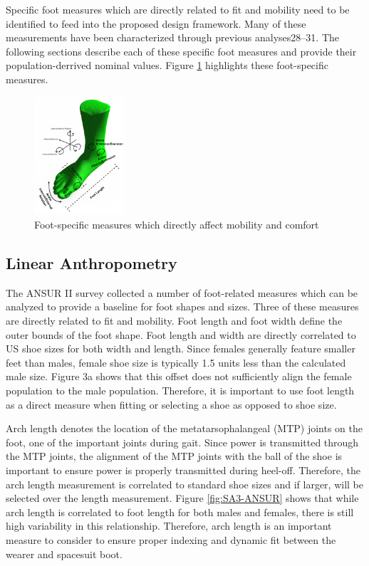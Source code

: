 \documentclass[defaultstyle,11pt]{comps}
\begin{document}
Specific foot measures which are directly related to fit and mobility need to be identified to feed into the proposed design framework.
Many of these measurements have been characterized through previous analyses28--31.
The following sections describe each of these specific foot measures and provide their population-derrived nominal values.
Figure \ref{fig:SA3-Foot} highlights these foot-specific measures.

\begin{figure}
\hypertarget{fig:SA3-Foot}{%
\centering
\includegraphics[width=0.3\textwidth,height=\textheight]{../fig/SA3/FootOverview.png}
\caption{Foot-specific measures which directly affect mobility and comfort}\label{fig:SA3-Foot}
}
\end{figure}

\hypertarget{linear-anthropometry}{%
\subsection{Linear Anthropometry}\label{linear-anthropometry}}

The ANSUR II survey collected a number of foot-related measures which can be analyzed to provide a baseline for foot shapes and sizes\citep{Gordon2014}.
Three of these measures are directly related to fit and mobility.
Foot length and foot width define the outer bounds of the foot shape.
Foot length and width are directly correlated to US shoe sizes for both width and length.
Since females generally feature smaller feet than males, female shoe size is typically 1.5 units less than the calculated male size.
Figure 3a shows that this offset does not sufficiently align the female population to the male population.
Therefore, it is important to use foot length as a direct measure when fitting or selecting a shoe as opposed to shoe size.

Arch length denotes the location of the metatarsophalangeal (MTP) joints on the foot, one of the important joints during gait.
Since power is transmitted through the MTP joints, the alignment of the MTP joints with the ball of the shoe is important to ensure power is properly transmitted during heel-off.
Therefore, the arch length measurement is correlated to standard shoe sizes and if larger, will be selected over the length measurement.
Figure \ref{fig:SA3-ANSUR} shows that while arch length is correlated to foot length for both males and females, there is still high variability in this relationship.
Therefore, arch length is an important measure to consider to ensure proper indexing and dynamic fit between the wearer and spacesuit boot.
\end{document}
